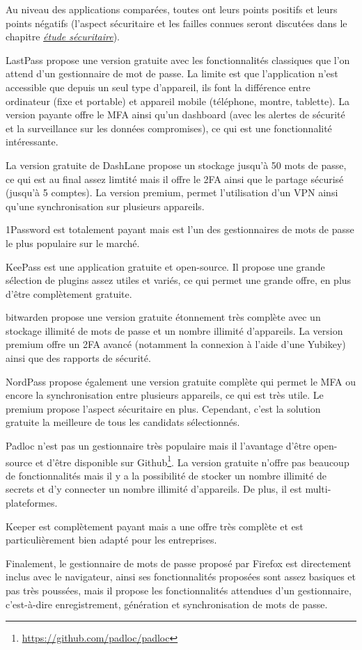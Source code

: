 Au niveau des applications comparées, toutes ont leurs points positifs et leurs points négatifs (l'aspect sécuritaire et les failles connues seront discutées dans le chapitre \hyperref[ch:etude_secu]{\textit{étude sécuritaire}}). 

LastPass propose une version gratuite avec les fonctionnalités classiques que l'on attend d'un gestionnaire de mot de passe. La limite est que l'application n'est accessible que depuis un seul type d'appareil, ils font la différence entre ordinateur (fixe et portable) et appareil mobile (téléphone, montre, tablette). La version payante offre le MFA ainsi qu'un dashboard (avec les alertes de sécurité et la surveillance sur les données compromises), ce qui est une fonctionnalité intéressante.

La version gratuite de DashLane propose un stockage jusqu'à 50 mots de passe, ce qui est au final assez limtité mais il offre le 2FA ainsi que le partage sécurisé (jusqu'à 5 comptes). La version premium, permet l'utilisation d'un VPN ainsi qu'une synchronisation sur plusieurs appareils.

1Password est totalement payant mais est l'un des gestionnaires de mots de passe le plus populaire sur le marché.

KeePass est une application gratuite et open-source. Il propose une grande sélection de plugins assez utiles et variés, ce qui permet une grande offre, en plus d'être complètement gratuite.

bitwarden propose une version gratuite étonnement très complète avec un stockage illimité de mots de passe et un nombre illimité d'appareils. La version premium offre un 2FA avancé (notamment la connexion à l'aide d'une Yubikey) ainsi que des rapports de sécurité.

NordPass propose également une version gratuite complète qui permet le MFA ou encore la synchronisation entre plusieurs appareils, ce qui est très utile. Le premium propose l'aspect sécuritaire en plus. Cependant, c'est la solution gratuite la meilleure de tous les candidats sélectionnés.

Padloc n'est pas un gestionnaire très populaire mais il l'avantage d'être open-source et d'être disponible sur Github\footnote{\href{https://github.com/padloc/padloc}{https://github.com/padloc/padloc}}. La version gratuite n'offre pas beaucoup de fonctionnalités mais il y a la possibilité de stocker un nombre illimité de secrets et d'y connecter un nombre illimité d'appareils. De plus, il est multi-plateformes.

Keeper est complètement payant mais a une offre très complète et est particulièrement bien adapté pour les entreprises.

Finalement, le gestionnaire de mots de passe proposé par Firefox est directement inclus avec le navigateur, ainsi ses fonctionnalités proposées sont assez basiques et pas très poussées, mais il propose les fonctionnalités attendues d'un gestionnaire, c'est-à-dire enregistrement, génération et synchronisation de mots de passe.
